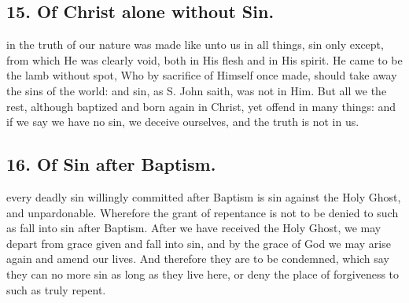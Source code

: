 \subsection{15. Of Christ alone without Sin.}
 in the truth of our nature was made like unto us in all things, sin only except, from which He was clearly void, both in His flesh and in His spirit. He came to be the lamb without spot, Who by sacrifice of Himself once made, should take away the sins of the world: and sin, as S. John saith, was not in Him. But all we the rest, although baptized and born again in Christ, yet offend in many things: and if we say we have no sin, we deceive ourselves, and the truth is not in us.

\subsection{16. Of Sin after Baptism.}
 every deadly sin willingly committed after Baptism is sin against the Holy Ghost, and unpardonable. Wherefore the grant of repentance is not to be denied to such as fall into sin after Baptism. After we have received the Holy Ghost, we may depart from grace given and fall into sin, and by the grace of God we may arise again and amend our lives. And therefore they are to be condemned, which say they can no more sin as long as they live here, or deny the place of forgiveness to such as truly repent.

